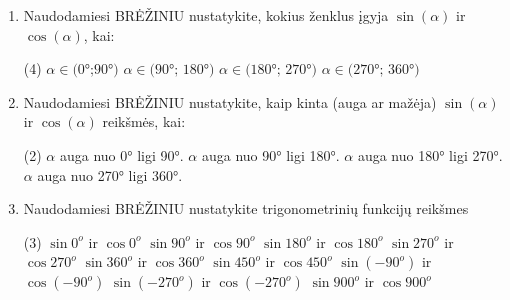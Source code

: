 \documentclass[a4paper]{article}
\newcommand{\hitem}[1]{\item[\stepcounter{enumi}\href{#1}{\theenumi.}]} %
\newcounter{nameOfYourChoice}
\newcommand{\save}{\setcounter{nameOfYourChoice}{\value{enumi}}} %
\begin{document}
\begin{mdframed}[backgroundcolor=blue!10!white, linewidth=3pt]
\begin{enumerate}
\item Naudodamiesi BRĖŽINIU nustatykite, kokius ženklus įgyja $\sin(\alpha)$ ir $\cos(\alpha)$, kai:
\begin{tasks}(4)
\task $\alpha \in \text{(0°;90°)}$
\task $\alpha \in \text{(90°; 180°)}$
\task $\alpha \in \text{(180°; 270°)}$
\task $\alpha \in \text{(270°; 360°)}$
\end{tasks}
\item Naudodamiesi BRĖŽINIU nustatykite, kaip kinta (auga ar mažėja) $\sin(\alpha)$ ir $\cos(\alpha)$ reikšmės, kai:
\begin{tasks}(2)
\task $\alpha$ auga nuo 0° ligi 90°.
\task $\alpha$ auga nuo 90° ligi 180°.
\task $\alpha$ auga nuo 180° ligi 270°.
\task $\alpha$ auga nuo 270° ligi 360°.
\end{tasks}
\hitem{https://www.wolframalpha.com/input/?i=cos+90} Naudodamiesi BRĖŽINIU nustatykite trigonometrinių funkcijų reikšmes 
\begin{tasks}(3)
\task $\sin{0^o}$ ir $\cos{0^o}$
\task $\sin{90^o}$ ir $\cos{90^o}$
\task $\sin{180^o}$ ir $\cos{180^o}$
\task $\sin{270^o}$ ir $\cos{270^o}$
\task $\sin{360^o}$ ir $\cos{360^o}$
\task $\sin{450^o}$ ir $\cos{450^o}$
\task $\sin{(-90^o)}$ ir $\cos{(-90^o)}$
\task $\sin{(-270^o)}$ ir $\cos{(-270^o)}$
\task $\sin{900^o}$ ir $\cos{900^o}$
\end{tasks}
\save \end{enumerate}
\end{mdframed}
\end{document}
